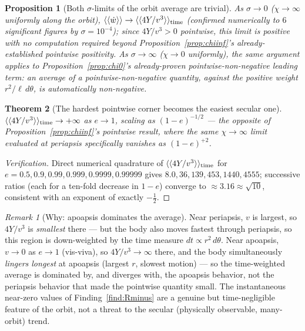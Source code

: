 \documentclass[12pt]{amsart}
\theoremstyle{plain}
\newtheorem{theorem}{Theorem}[section]
\newtheorem{proposition}[theorem]{Proposition}
\theoremstyle{remark}
\newtheorem*{remark}{Remark}
\begin{document}
\begin{proposition}[Both $\sigma$-limits of the orbit average are trivial]\label{prop:orbitavglimits}
As $\sigma\to0$ ($\chi\to\infty$ uniformly along the orbit), $\langle\langle\dot w\rangle\rangle\to\langle\langle4Y/v^3\rangle\rangle_{\rm time}$ (confirmed numerically to $6$ significant figures by $\sigma=10^{-4}$); since $4Y/v^3>0$ pointwise, this limit is positive with no computation required beyond Proposition~\ref{prop:chiinf}'s already-established pointwise positivity. As $\sigma\to\infty$ ($\chi\to0$ uniformly), the same argument applies to Proposition~\ref{prop:chi0}'s already-proven pointwise-non-negative leading term: an average of a pointwise-non-negative quantity, against the positive weight $r^2/\ell\,d\theta$, is automatically non-negative.
\end{proposition}

\begin{theorem}[The hardest pointwise corner becomes the easiest secular one]\label{thm:reversal}
$\langle\langle4Y/v^3\rangle\rangle_{\rm time}\to+\infty$ as $e\to1$, scaling as $(1-e)^{-1/2}$ --- the opposite of Proposition~\ref{prop:chiinf}'s pointwise result, where the same $\chi\to\infty$ limit evaluated \emph{at periapsis specifically} vanishes as $(1-e)^{+2}$.
\end{theorem}

\begin{proof}[Verification]
Direct numerical quadrature of $\langle\langle4Y/v^3\rangle\rangle_{\rm time}$ for $e=0.5,0.9,0.99,0.999,0.9999,0.99999$ gives $8.0,36,139,453,1440,4555$; successive ratios (each for a ten-fold decrease in $1-e$) converge to $\approx3.16\approx\sqrt{10}$, consistent with an exponent of exactly $-\tfrac12$.
\end{proof}

\begin{remark}[Why: apoapsis dominates the average]
Near periapsis, $v$ is largest, so $4Y/v^3$ is \emph{smallest} there --- but the body also moves fastest through periapsis, so this region is down-weighted by the time measure $dt\propto r^2\,d\theta$. Near apoapsis, $v\to0$ as $e\to1$ (vis-viva), so $4Y/v^3\to\infty$ there, and the body simultaneously \emph{lingers longest} at apoapsis (largest $r$, slowest motion) --- so the time-weighted average is dominated by, and diverges with, the apoapsis behavior, not the periapsis behavior that made the pointwise quantity small. The instantaneous near-zero values of Finding~\ref{find:Rminus} are a genuine but time-negligible feature of the orbit, not a threat to the secular (physically observable, many-orbit) trend.
\end{remark}
\end{document}
